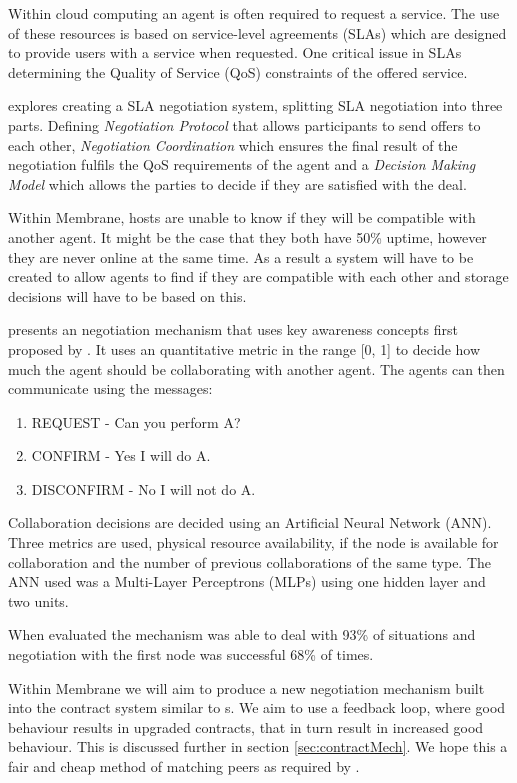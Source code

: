 \documentclass[11pt, a4paper, twoside]{report}
\begin{document}
Within cloud computing an agent is often required to request a service. The use of these resources is based on service-level agreements (SLAs) which are designed to provide users with a service when requested. \citep{paletta2009mas} One critical issue in SLAs determining the Quality of Service (QoS) constraints of the offered service.

\cite{yan2007autonomous} explores creating a SLA negotiation system, splitting SLA negotiation into three parts. Defining \emph{Negotiation Protocol} that allows participants to send offers to each other, \emph{Negotiation Coordination} which ensures the final result of the negotiation fulfils the QoS requirements of the agent and a \emph{Decision Making Model} which allows the parties to decide if they are satisfied with the deal.

Within Membrane, hosts are unable to know if they will be compatible with another agent. It might be the case that they both have 50\% uptime, however they are never online at the same time. As a result a system will have to be created to allow agents to find if they are compatible with each other and storage decisions will have to be based on this.

\cite{paletta2009mas} presents an negotiation mechanism that uses key awareness concepts first proposed by \cite{herrero2007agents}. It uses an quantitative metric in the range [0, 1] to decide how much the agent should be collaborating with another agent. The agents can then communicate using the messages:

\begin{enumerate}
 \item REQUEST - Can you perform A?
 \item CONFIRM - Yes I will do A.
 \item DISCONFIRM - No I will not do A.
\end{enumerate}

Collaboration decisions are decided using an Artificial Neural Network (ANN). Three metrics are used, physical resource availability, if the node is available for collaboration and the number of previous collaborations of the same type. The ANN used was a Multi-Layer Perceptrons (MLPs) using one hidden layer and two units.

When evaluated the mechanism was able to deal with 93\% of situations and negotiation with the first node was successful 68\% of times. \citep{herrero2007agents}

Within Membrane we will aim to produce a new negotiation mechanism built into the  contract system similar to \cite{paletta2009mas}s. We aim to use a feedback loop, where good behaviour results in upgraded contracts, that in turn result in increased good behaviour. This is discussed further in section \ref{sec:contractMech}. We hope this a fair and cheap method of matching peers as required by \cite{rahwan2005interest}.
\end{document}
